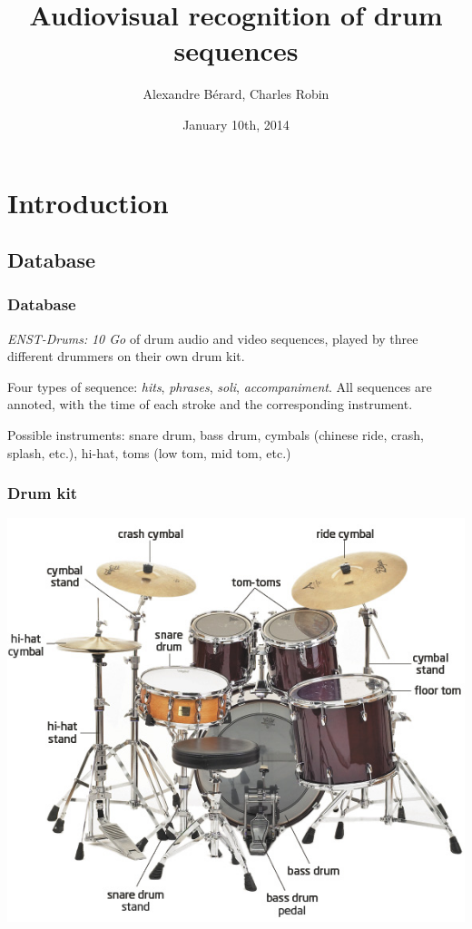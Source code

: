 \documentclass{beamer}
\title[Audiovisual recognition of drum sequences]{Audiovisual recognition of drum sequences}
\author[A.~Bérard, C.~Robin]{Alexandre Bérard, Charles Robin}
\date{January 10th, 2014}
\begin{document}
    \begin{frame}
    \titlepage
    \end{frame}

    \section{Introduction}    
    \subsection{Database}
    \begin{frame}
        \frametitle{Database}
        \emph{ENST-Drums:} \emph{10 Go} of drum audio and video sequences, played by three different drummers on their own drum kit.
        \vspace*{0.5cm}
       
        Four types of sequence: \emph{hits}, \emph{phrases}, \emph{soli}, \emph{accompaniment}. All sequences are annoted, with the time of each stroke and the corresponding instrument.
        \vspace*{0.5cm}

        Possible instruments: snare drum, bass drum, cymbals (chinese ride, crash, splash, etc.), hi-hat, toms (low tom, mid tom, etc.)
    \end{frame}
    \begin{frame}
        \frametitle{Drum kit}
        \begin{center}
            \includegraphics[scale=0.35]{drum-kit.jpg}
        \end{center}
    \end{frame}
\end{document}
